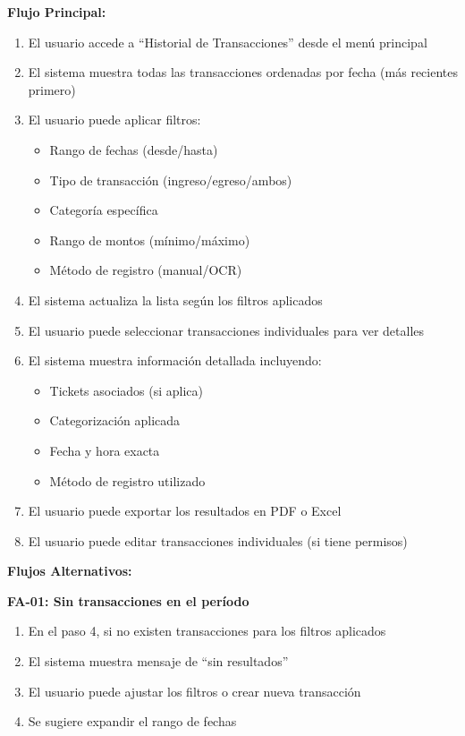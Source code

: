 \noindent\textbf{Flujo Principal:}
\begin{enumerate}
    \item El usuario accede a ``Historial de Transacciones'' desde el menú principal
    \item El sistema muestra todas las transacciones ordenadas por fecha (más recientes primero)
    \item El usuario puede aplicar filtros:
    \begin{itemize}
        \item Rango de fechas (desde/hasta)
        \item Tipo de transacción (ingreso/egreso/ambos)
        \item Categoría específica
        \item Rango de montos (mínimo/máximo)
        \item Método de registro (manual/OCR)
    \end{itemize}
    \item El sistema actualiza la lista según los filtros aplicados
    \item El usuario puede seleccionar transacciones individuales para ver detalles
    \item El sistema muestra información detallada incluyendo:
    \begin{itemize}
        \item Tickets asociados (si aplica)
        \item Categorización aplicada
        \item Fecha y hora exacta
        \item Método de registro utilizado
    \end{itemize}
    \item El usuario puede exportar los resultados en PDF o Excel
    \item El usuario puede editar transacciones individuales (si tiene permisos)
\end{enumerate}

\noindent\textbf{Flujos Alternativos:}

\textbf{FA-01: Sin transacciones en el período}
\begin{enumerate}
    \item En el paso 4, si no existen transacciones para los filtros aplicados
    \item El sistema muestra mensaje de ``sin resultados''
    \item El usuario puede ajustar los filtros o crear nueva transacción
    \item Se sugiere expandir el rango de fechas
\end{enumerate}

